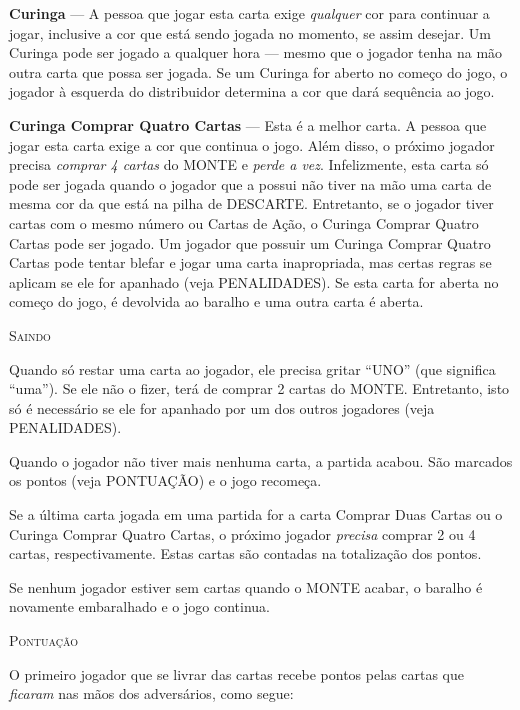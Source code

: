\textbf{Curinga} --- A pessoa que jogar esta carta exige \textit{qualquer} cor para continuar a jogar, inclusive a cor que está sendo jogada no momento, se assim desejar. Um Curinga pode ser jogado a qualquer hora --- mesmo que o jogador tenha na mão outra carta que possa ser jogada. Se um Curinga for aberto no começo do jogo, o jogador à esquerda do distribuidor determina a cor que dará sequência ao jogo.

\textbf{Curinga Comprar Quatro Cartas} --- Esta é a melhor carta. A pessoa que jogar esta carta exige a cor que continua o jogo. Além disso, o próximo jogador precisa \textit{comprar 4 cartas} do MONTE e \textit{perde a vez}. Infelizmente, esta carta só pode ser jogada quando o jogador que a possui não tiver na mão uma carta de mesma cor da que está na pilha de DESCARTE. Entretanto, se o jogador tiver cartas com o mesmo número ou Cartas de Ação, o Curinga Comprar Quatro Cartas pode ser jogado. Um jogador que possuir um Curinga Comprar Quatro Cartas pode tentar blefar e jogar uma carta inapropriada, mas certas regras se aplicam se ele for apanhado (veja PENALIDADES). Se esta carta for aberta no começo do jogo, é devolvida ao baralho e uma outra carta é aberta.

\vspace{0.5cm}

\textsc{\large{Saindo}}

Quando só restar uma carta ao jogador, ele precisa gritar ``UNO'' (que significa ``uma''). Se ele não o fizer, terá de comprar 2 cartas do MONTE. Entretanto, isto só é necessário se ele for apanhado por um dos outros jogadores (veja PENALIDADES).

Quando o jogador não tiver mais nenhuma carta, a partida acabou. São marcados os pontos (veja PONTUAÇÃO) e o jogo recomeça.

Se a última carta jogada em uma partida for a carta Comprar Duas Cartas ou o Curinga Comprar Quatro Cartas, o próximo jogador \textit{precisa} comprar 2 ou 4 cartas, respectivamente. Estas cartas são contadas na totalização dos pontos.

Se nenhum jogador estiver sem cartas quando o MONTE acabar, o baralho é novamente embaralhado e o jogo continua.

\vspace{0.5cm}

\textsc{\large{Pontuação}}

O primeiro jogador que se livrar das cartas recebe pontos pelas cartas que \textit{ficaram} nas mãos dos adversários, como segue:

